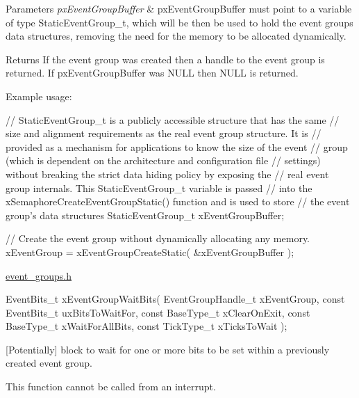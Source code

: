 \begin{DoxyParams}{Parameters}
{\em px\+Event\+Group\+Buffer} & px\+Event\+Group\+Buffer must point to a variable of type Static\+Event\+Group\+\_\+t, which will be then be used to hold the event group\textquotesingle{}s data structures, removing the need for the memory to be allocated dynamically.\\
\hline
\end{DoxyParams}
\begin{DoxyReturn}{Returns}
If the event group was created then a handle to the event group is returned. If px\+Event\+Group\+Buffer was N\+U\+LL then N\+U\+LL is returned.
\end{DoxyReturn}
Example usage\+: 
\begin{DoxyPre}
   // StaticEventGroup\_t is a publicly accessible structure that has the same
   // size and alignment requirements as the real event group structure.  It is
   // provided as a mechanism for applications to know the size of the event
   // group (which is dependent on the architecture and configuration file
   // settings) without breaking the strict data hiding policy by exposing the
   // real event group internals.  This StaticEventGroup\_t variable is passed
   // into the xSemaphoreCreateEventGroupStatic() function and is used to store
   // the event group's data structures
   StaticEventGroup\_t xEventGroupBuffer;\end{DoxyPre}



\begin{DoxyPre}   // Create the event group without dynamically allocating any memory.
   xEventGroup = xEventGroupCreateStatic( \&xEventGroupBuffer );
  \end{DoxyPre}
 \mbox{\hyperlink{event__groups_8h}{event\+\_\+groups.\+h}} 
\begin{DoxyPre}
   EventBits\_t xEventGroupWaitBits(     EventGroupHandle\_t xEventGroup,
                                    const EventBits\_t uxBitsToWaitFor,
                                    const BaseType\_t xClearOnExit,
                                    const BaseType\_t xWaitForAllBits,
                                    const TickType\_t xTicksToWait );
\end{DoxyPre}


\mbox{[}Potentially\mbox{]} block to wait for one or more bits to be set within a previously created event group.

This function cannot be called from an interrupt.


